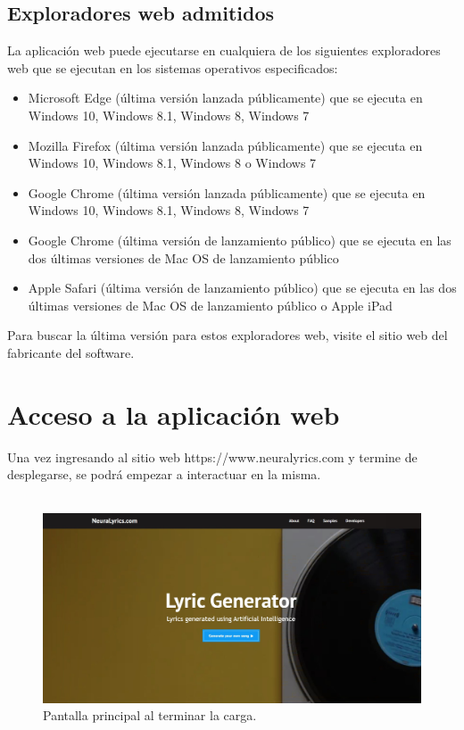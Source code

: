 \documentclass[12pt, a4paper, titlepage]{article}
\begin{document}
		\subsection{Exploradores web admitidos}
			La aplicación web puede ejecutarse en cualquiera de los siguientes
			exploradores web que se ejecutan en los sistemas operativos especificados:
			\begin{itemize}
			\item Microsoft Edge (última versión lanzada públicamente) que se ejecuta en Windows 10, Windows 8.1, Windows 8, Windows 7
			\item Mozilla Firefox (última versión lanzada públicamente) que se ejecuta en Windows 10, Windows 8.1, Windows 8 o Windows 7
			\item Google Chrome (última versión lanzada públicamente) que se ejecuta en Windows 10, Windows 8.1, Windows 8, Windows 7
			\item Google Chrome (última versión de lanzamiento público) que se ejecuta en las dos últimas versiones de Mac OS de lanzamiento público
			\item Apple Safari (última versión de lanzamiento público) que se ejecuta en las dos últimas versiones de Mac OS de lanzamiento público o Apple iPad
			\end{itemize}
			
			Para buscar la última versión para estos exploradores web,
			visite el sitio web del fabricante del software.

	\section{Acceso a la aplicación web}
	Una vez ingresando al sitio web https://www.neuralyrics.com y termine
	de desplegarse, se podrá empezar a interactuar en la misma.\\\\
		\begin{figure}[H]
		\includegraphics[width=13.5cm]{./Imagenes/Capturas/pprincipal.jpg}
		\centering \caption{Pantalla principal al terminar la carga.}
	\end{figure}
\end{document}

